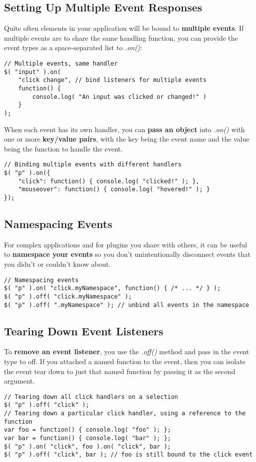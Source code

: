 \documentclass[10pt,letterpaper]{report}
\begin{document}
\subsection{Setting Up Multiple Event Responses}
Quite often elements in your application will be bound to \textbf{multiple events}. If multiple events are to share the same handling function, you can provide the event types as a space-separated list to \textit{.on()}:
\begin{lstlisting}
// Multiple events, same handler
$( "input" ).on(
	"click change", // bind listeners for multiple events
	function() {
		console.log( "An input was clicked or changed!" )
	}
);
\end{lstlisting}
When each event has its own handler, you can \textbf{pass an object} into \textit{.on()} with one or more \textbf{key/value pairs}, with the key being the event name and the value being the function to handle the event.
\begin{lstlisting}
// Binding multiple events with different handlers
$( "p" ).on({
	"click": function() { console.log( "clicked!" ); },
	"mouseover": function() { console.log( "hovered!" ); }
});
\end{lstlisting}
\subsection{Namespacing Events}
For complex applications and for plugins you share with others, it can be useful to \textbf{namespace your events} so you don't unintentionally disconnect events that you didn't or couldn't know about.
\begin{lstlisting}
// Namespacing events
$( "p" ).on( "click.myNamespace", function() { /* ... */ } );
$( "p" ).off( "click.myNamespace" );
$( "p" ).off( ".myNamespace" ); // unbind all events in the namespace
\end{lstlisting}
\subsection{Tearing Down Event Listeners}
To \textbf{remove an event listener}, you use the \textit{.off()} method and pass in the event type to off. If you attached a named function to the event, then you can isolate the event tear down to just that named function by passing it as the second argument.
\begin{lstlisting}
// Tearing down all click handlers on a selection
$( "p" ).off( "click" );
// Tearing down a particular click handler, using a reference to the function
var foo = function() { console.log( "foo" ); };
var bar = function() { console.log( "bar" ); };
$( "p" ).on( "click", foo ).on( "click", bar );
$( "p" ).off( "click", bar ); // foo is still bound to the click event
\end{lstlisting}
\end{document}
